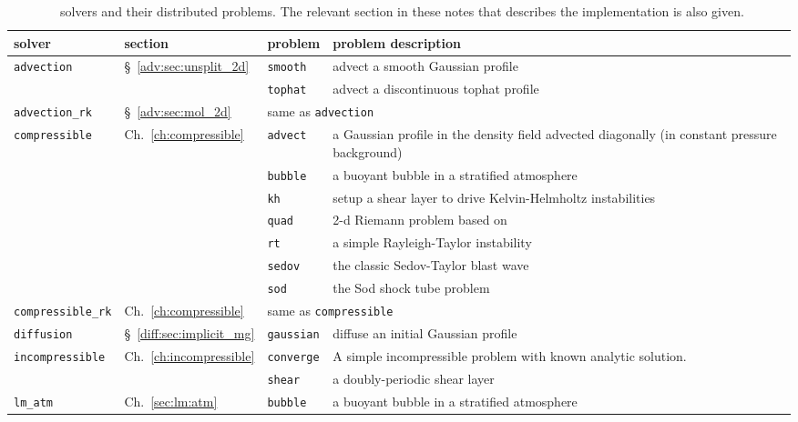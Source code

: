 \begin{sidewaystable*}
\centering
\renewcommand{\arraystretch}{1.2}
\begin{tabular}{lp{1in}lp{4.0in}}
\hline
{\bf solver} & {\bf section} & {\bf problem} 
   & {\bf problem description} \\
\hline
%
\multirow{2}{*}{\tt advection}
   & \multirow{2}{*}{\S~\ref{adv:sec:unsplit_2d}}
   & {\tt smooth} & advect a smooth Gaussian profile \\
   & & {\tt tophat} & advect a discontinuous tophat profile \\
\hline
%
\multirow{1}{*}{\tt advection\_rk} 
   & \multirow{1}{*}{\S~\ref{adv:sec:mol_2d}}
   & \multicolumn{2}{l}{same as {\tt advection}} \\
\hline
%
\multirow{7}{*}{\tt compressible} 
   & \multirow{7}{*}{Ch.~\ref{ch:compressible}}
   & {\tt advect} & a Gaussian profile in the density field advected diagonally (in constant pressure background) \\
   & & {\tt bubble} & a buoyant bubble in a stratified atmosphere \\
   & & {\tt kh} & setup a shear layer to drive Kelvin-Helmholtz instabilities \\
   & & {\tt quad} & 2-d Riemann problem based on \cite{schulz-rinne:1993}  \\
   & & {\tt rt}  & a simple Rayleigh-Taylor instability\\
   & & {\tt sedov} & the classic Sedov-Taylor blast wave \\
   & & {\tt sod} & the Sod shock tube problem  \\
\hline
%
\multirow{1}{*}{\tt compressible\_rk} 
   & \multirow{1}{*}{Ch.~\ref{ch:compressible}}
   & \multicolumn{2}{l}{same as {\tt compressible}} \\
\hline
%
{\tt diffusion} & \S~\ref{diff:sec:implicit_mg} & {\tt gaussian} 
   & diffuse an initial Gaussian profile \\
\hline
%
\multirow{2}{*}{\tt incompressible} 
   & \multirow{2}{*}{Ch.~\ref{ch:incompressible}}
   & {\tt converge} & A simple incompressible problem with known
                      analytic solution.\\
   & & {\tt shear} & a doubly-periodic shear layer \\
\hline
%
\multirow{1}{*}{\tt lm\_atm} 
   & \multirow{1}{*}{Ch.~\ref{sec:lm:atm}}
   & {\tt bubble} & a buoyant bubble in a stratified atmosphere \\
\hline
\end{tabular}
\caption{\label{tab:problems} \pyro\ solvers and their distributed problems.  The relevant section in these notes that describes the implementation is also given.}
\renewcommand{\arraystretch}{1.0}
\end{sidewaystable*}




